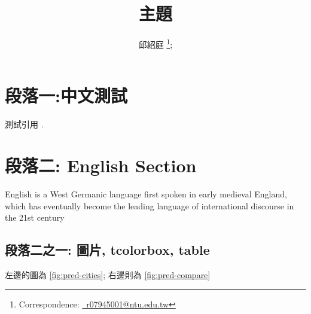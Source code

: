 \documentclass[12pt, a4paper]{article}
\title{\textbf{主題}}
\author{邱紹庭%
\thanks{ 
    Correspondence: \href{mailto:r07945001@ntu.edu.tw}{\faInbox~r07945001@ntu.edu.tw}}; 
}
\begin{document}
\maketitle

\section{段落一:中文測試}

測試引用 \cite{mobility2020}. 

\section{段落二: English Section}

English is a West Germanic language first spoken in early medieval England, which has eventually become the leading language of international discourse in the 21st century

\subsection{段落二之一: 圖片, tcolorbox, table}

左邊的圖為 \ref{fig:pred-cities}; 右邊則為 \ref{fig:pred-compare}
\end{document}
